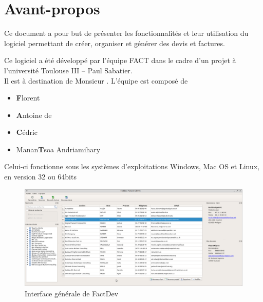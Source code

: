 \chapter*{Avant-propos}
Ce document a pour but de présenter les fonctionnalités et leur utilisation du logiciel permettant de créer, organiser et générer des devis et factures. 

Ce logiciel a été développé par l'équipe FACT dans le cadre d'un projet à l'université Toulouse III -- Paul Sabatier. \\
Il est à destination de Monsieur .
L'équipe est composé de 
\begin{itemize}
	\item \textbf{F}lorent 
	\item \textbf{A}ntoine de 
	\item \textbf{C}édric 
	\item Manan\textbf{T}soa Andriamihary 
\end{itemize}

Celui-ci fonctionne sous les systèmes d’exploitations Windows, Mac OS et Linux, en version 32 ou 64bits
\begin{figure}[H]
	\centering
	\includegraphics[width=15cm]{screens/ihmClients.png}
	\caption{Interface générale de FactDev}
	\label{fig:intro}
\end{figure}
